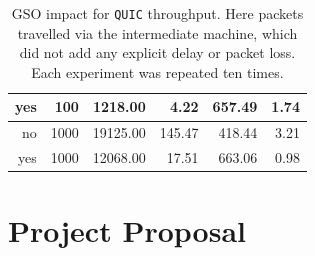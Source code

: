 \documentclass[12pt,a4paper]{report}
\begin{document}
\begin{table}[H]
\begin{tabular}{|r|r|r|r|r|r|}
yes                                                                             & 100                                                                                            & 1218.00                                                                                               & 4.22                                                                                                                                & 657.49                                                                                                                                     & 1.74                                                                                                                              \\ \hline
no                                                                              & 1000                                                                                           & 19125.00                                                                                              & 145.47                                                                                                                              & 418.44                                                                                                                                     & 3.21                                                                                                                              \\ \hline
yes                                                                             & 1000                                                                                           & 12068.00                                                                                              & 17.51                                                                                                                               & 663.06                                                                                                                                     & 0.98                                                                                                                              \\ \hline
\end{tabular}
    \centering
    \caption[GSO impact for \texttt{QUIC} throughput]{GSO impact for \texttt{QUIC} throughput. Here packets travelled via the intermediate machine, which did not add any explicit delay or packet loss. Each experiment was repeated ten times.}
    \label{GSO_impact_measurement_results}
\end{table}




\chapter*{Project Proposal}



% 



 
\end{document}
